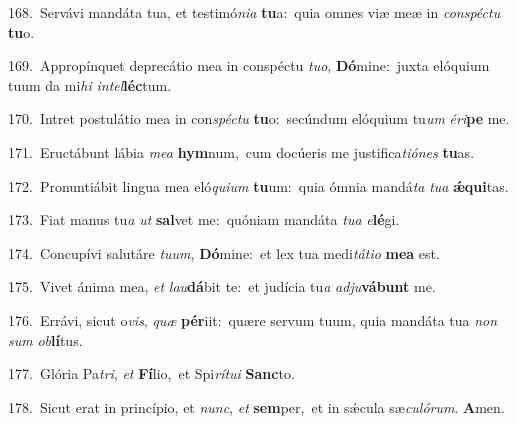 {\numbfont\textcolor{\numbcolor}{168.}}~Servávi mandáta tua, et testimó\-\textit{ni}\-\textit{a} \textbf{tu}\-a:~\star quia omnes viæ meæ in \textit{con}\-\textit{spéc}\textit{tu} \textbf{tu}\-o.\par
{\numbfont\textcolor{\numbcolor}{169.}}~Appropínquet deprecátio mea in conspéctu \textit{tu}\-\textit{o}, \textbf{Dó}\-mine:~\star juxta elóquium tuum da mi\textit{hi} \textit{in}\-\textit{tel}\textbf{léc}tum.\par
{\numbfont\textcolor{\numbcolor}{170.}}~Intret postulátio mea in con\-\textit{spéc}\-\textit{tu} \textbf{tu}\-o:~\star secúndum elóquium tu\textit{um} \textit{é}\-\textit{ri}\textbf{pe} me.\par
{\numbfont\textcolor{\numbcolor}{171.}}~Eructábunt lábia \textit{me}\-\textit{a} \textbf{hym}\-num,~\star cum docúeris me justifica\-\textit{ti}\-\textit{ó}\textit{nes} \textbf{tu}\-as.\par
{\numbfont\textcolor{\numbcolor}{172.}}~Pronuntiábit lingua mea eló\-\textit{qui}\-\textit{um} \textbf{tu}\-um:~\star quia ómnia mandá\textit{ta} \textit{tu}\-\textit{a} \textbf{ǽ}\-\textbf{qui}tas.\par
{\numbfont\textcolor{\numbcolor}{173.}}~Fiat manus tu\textit{a} \textit{ut} \textbf{sal}\-vet me:~\star quóniam mandáta \textit{tu}\-\textit{a} \textit{e}\-\textbf{lé}gi.\par
{\numbfont\textcolor{\numbcolor}{174.}}~Concupívi salutáre \textit{tu}\-\textit{um}, \textbf{Dó}\-mine:~\star et lex tua medi\-\textit{tá}\-\textit{ti}\textit{o} \textbf{me}\-\textbf{a} est.\par
{\numbfont\textcolor{\numbcolor}{175.}}~Vivet ánima mea, \textit{et} \textit{lau}\-\textbf{dá}bit te:~\star et judícia tu\textit{a} \textit{ad}\-\textit{ju}\textbf{vá}\textbf{bunt} me.\par
{\numbfont\textcolor{\numbcolor}{176.}}~Errávi, sicut o\-\textit{vis}\-, \textit{quæ} \textbf{pér}\-iit:~\star quære servum tuum, quia mandáta tua \textit{non} \textit{sum} \textit{ob}\-\textbf{lí}tus.\par
{\numbfont\textcolor{\numbcolor}{177.}}~Glória Pa\-\textit{tri}\-, \textit{et} \textbf{Fí}\-lio,~\star et Spi\-\textit{rí}\-\textit{tu}\textit{i} \textbf{Sanc}\-to.\par
{\numbfont\textcolor{\numbcolor}{178.}}~Sicut erat in princípio, et \textit{nunc}\-, \textit{et} \textbf{sem}\-per,~\star et in sǽcula sæ\-\textit{cu}\-\textit{ló}\textit{rum}. \textbf{A}\-men.\par
